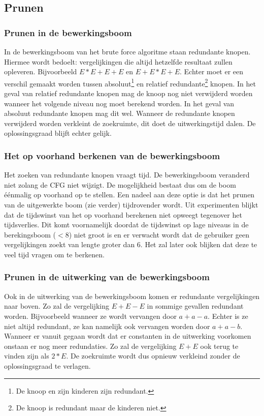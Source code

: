 \documentclass[Main.tex]{subfiles}
\begin{document}
\subsection{Prunen} \label{ssec:Prunen}
\subsubsection*{Prunen in de bewerkingsboom}
In de bewerkingsboom van het brute force algoritme staan redundante knopen. Hiermee wordt bedoelt: vergelijkingen die altijd hetzelfde resultaat zullen opleveren. Bijvoorbeeld $E \ast E+E+E$ en $E+E \ast E +E$. Echter moet er een verschil gemaakt worden tussen absoluut\footnote{\label{note:absoluut}De knoop en zijn kinderen zijn redundant.} en relatief redundante\footnote{\label{note:relatief}De knoop is redundant maar de kinderen niet.} knopen.
In het geval van relatief redundante knopen mag de knoop nog niet verwijderd worden wanneer het volgende niveau nog moet berekend worden. In het geval van absoluut redundante knopen mag dit wel. Wanneer de redundante knopen verwijderd worden verkleint de zoekruimte, dit doet de uitwerkingstijd dalen. De oplossingsgraad blijft echter gelijk.
\subsubsection*{Het op voorhand berkenen van de bewerkingsboom}
Het zoeken van redundante knopen vraagt tijd. De bewerkingsboom veranderd niet zolang de CFG niet wijzigt. De mogelijkheid bestaat dus om de boom \'e\'enmalig op voorhand op te stellen. Een nadeel aan deze optie is dat het prunen van de uitgewerkte boom (zie verder) tijdrovender wordt. Uit experimenten blijkt dat de tijdswinst van het op voorhand berekenen niet opweegt tegenover het tijdsverlies. Dit komt voornamelijk doordat de tijdswinst op lage niveaus in de berekingsboom ($< 8$) niet groot is en er verwacht wordt dat de gebruiker geen vergelijkingen zoekt van lengte groter dan 6. Het zal later ook blijken dat deze te veel tijd vragen om te berkenen. 
\subsubsection*{Prunen in de uitwerking van de bewerkingsboom}
Ook in de uitwerking van de bewerkingsboom komen er redundante vergelijkingen naar boven. Zo zal de vergelijking $E+E-E$ in sommige gevallen redundant worden. Bijvoorbeeld wanneer ze wordt vervangen door $a+a-a$. Echter is ze niet altijd redundant, ze kan namelijk ook vervangen worden door $a+a-b$. Wanneer er vanuit gegaan wordt dat er constanten in de uitwerking voorkomen onstaan er nog meer redundaties. Zo zal de vergelijking $E+E$ ook terug te vinden zijn als $2*E$. De zoekruimte wordt dus opnieuw verkleind zonder de oplossingsgraad te verlagen.
\end{document}
